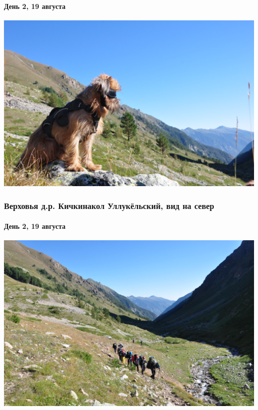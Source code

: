\begin{frame}
	\framesubtitle{День 2, 19 августа}
	\centering
	\includegraphics[width=\linewidth]{../pics/DSC_0687}
	\end{frame}

\begin{frame}
	\frametitle{Верховья д.р. Кичкинакол Уллукёльский, вид на север}
	\framesubtitle{День 2, 19 августа}
	\centering
	\includegraphics[width=\linewidth]{../pics/DSC_0696}
	\end{frame}

